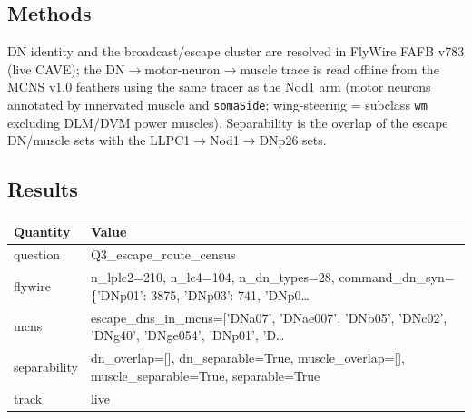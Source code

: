 \documentclass[11pt]{article}
\begin{document}
\subsection*{Methods}
DN identity and the broadcast/escape cluster are resolved in FlyWire FAFB v783 (live CAVE); the DN$\rightarrow$motor-neuron$\rightarrow$muscle trace is read offline from the MCNS v1.0 feathers using the same tracer as the Nod1 arm (motor neurons annotated by innervated muscle and \texttt{somaSide}; wing-steering = subclass \texttt{wm} excluding DLM/DVM power muscles). Separability is the overlap of the escape DN/muscle sets with the LLPC1$\rightarrow$Nod1$\rightarrow$DNp26 sets.

\subsection*{Results}
\begin{longtable}{@{}p{}p{}@{}}
\toprule
\textbf{Quantity} & \textbf{Value} \\
\midrule
\endhead
question & Q3\_escape\_route\_census \\
flywire & n\_lplc2=210, n\_lc4=104, n\_dn\_types=28, command\_dn\_syn=\{'DNp01': 3875, 'DNp03': 741, 'DNp0… \\
mcns & escape\_dns\_in\_mcns=['DNa07', 'DNae007', 'DNb05', 'DNc02', 'DNg40', 'DNge054', 'DNp01', 'D… \\
separability & dn\_overlap=[], dn\_separable=True, muscle\_overlap=[], muscle\_separable=True, separable=True \\
track & live \\
\bottomrule
\end{longtable}
\end{document}
